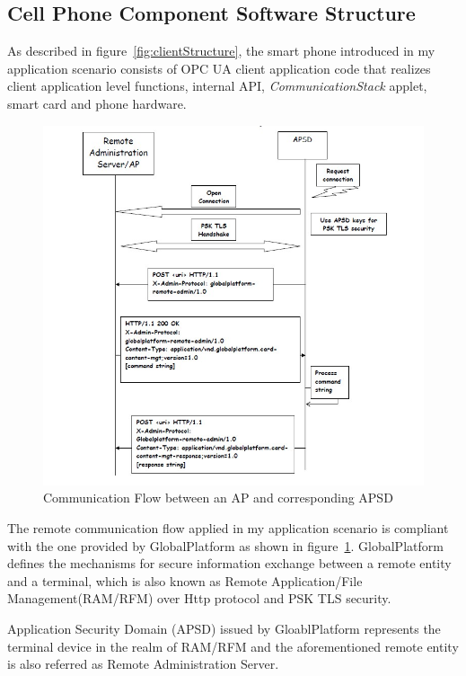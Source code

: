 \subsection{Cell Phone Component Software Structure}
As described in figure~\ref{fig:clientStructure}, the smart phone introduced in my application scenario consists of OPC UA client application code that realizes client application level functions, internal API, \emph{CommunicationStack} applet, smart card and phone hardware.

\begin{figure}[!htb]
	\centering
	\includegraphics[width=1.2\textwidth]{apsd.jpg}
		\caption{Communication Flow between an AP and corresponding APSD\cite{ramGP}}
	\label{fig:apsd}
\end{figure}
The remote communication flow applied in my application scenario is compliant with the one provided by GlobalPlatform as shown in figure~\ref{fig:apsd}. GlobalPlatform defines the mechanisms for secure information exchange between a remote entity and a terminal, which is also known as Remote Application/File Management(RAM/RFM) over Http protocol and PSK TLS security. 

Application Security Domain (APSD) issued by GloablPlatform represents the terminal device in the realm of RAM/RFM and the aforementioned remote entity  is also referred as Remote Administration Server. 

